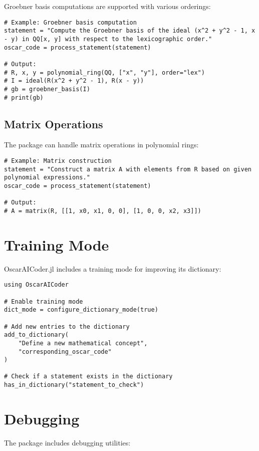 \documentclass[11pt,a4paper]{article}
\begin{document}
Groebner basis computations are supported with various orderings:

\begin{lstlisting}
# Example: Groebner basis computation
statement = "Compute the Groebner basis of the ideal (x^2 + y^2 - 1, x - y) in QQ[x, y] with respect to the lexicographic order."
oscar_code = process_statement(statement)

# Output:
# R, x, y = polynomial_ring(QQ, ["x", "y"], order="lex")
# I = ideal(R(x^2 + y^2 - 1), R(x - y))
# gb = groebner_basis(I)
# print(gb)
\end{lstlisting}

\subsection{Matrix Operations}

The package can handle matrix operations in polynomial rings:

\begin{lstlisting}
# Example: Matrix construction
statement = "Construct a matrix A with elements from R based on given polynomial expressions."
oscar_code = process_statement(statement)

# Output:
# A = matrix(R, [[1, x0, x1, 0, 0], [1, 0, 0, x2, x3]])
\end{lstlisting}

\section{Training Mode}

OscarAICoder.jl includes a training mode for improving its dictionary:

\begin{lstlisting}
using OscarAICoder

# Enable training mode
dict_mode = configure_dictionary_mode(true)

# Add new entries to the dictionary
add_to_dictionary(
    "Define a new mathematical concept",
    "corresponding_oscar_code"
)

# Check if a statement exists in the dictionary
has_in_dictionary("statement_to_check")
\end{lstlisting}

\section{Debugging}

The package includes debugging utilities:
\end{document}
